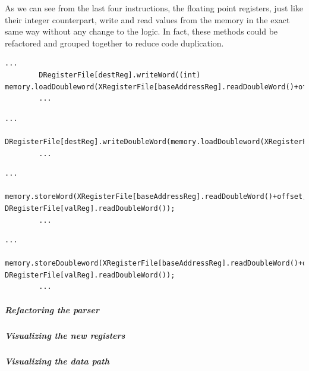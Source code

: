 	As we can see from the last four instructions, the floating point registers, just like their integer counterpart, write and read values from the memory in the exact same way without any change to the logic. In fact, these methods could be refactored and grouped together to reduce code duplication.
	
	\begin{lstlisting}[caption={LDURS}]
		...
		DRegisterFile[destReg].writeWord((int) memory.loadDoubleword(XRegisterFile[baseAddressReg].readDoubleWord()+offset));
		...
	\end{lstlisting}
	\begin{lstlisting}[caption={LDURD}]
		...
		DRegisterFile[destReg].writeDoubleWord(memory.loadDoubleword(XRegisterFile[baseAddressReg].readDoubleWord()+offset));
		...
	\end{lstlisting}
	
	\begin{lstlisting}[caption={STURS}]
		...
		memory.storeWord(XRegisterFile[baseAddressReg].readDoubleWord()+offset, DRegisterFile[valReg].readDoubleWord());
		...
	\end{lstlisting}
	\begin{lstlisting}[caption={STURD}]
		...
		memory.storeDoubleword(XRegisterFile[baseAddressReg].readDoubleWord()+offset, DRegisterFile[valReg].readDoubleWord());
		...
	\end{lstlisting}

\subparagraph*{Refactoring the parser}
\subparagraph*{Visualizing the new registers}
\subparagraph*{Visualizing the data path}